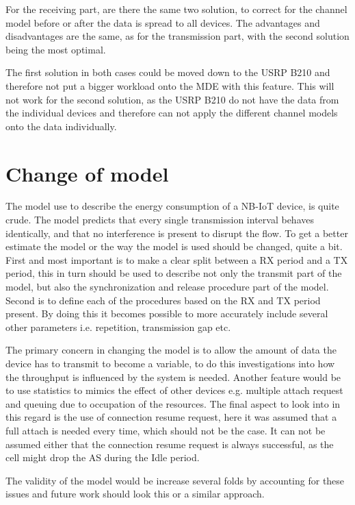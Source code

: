 For the receiving part, are there the same two solution, to correct for the channel model before or after the data is spread to all devices. The advantages and disadvantages are the same, as for the transmission part, with the second solution being the most optimal.

The first solution in both cases could be moved down to the USRP B210 and therefore not put a bigger workload onto the MDE with this feature. This will not work for the second solution, as the USRP B210 do not have the data from the individual devices and therefore can not apply the different channel models onto the data individually.

\section{Change of model}
The model use to describe the energy consumption of a NB-IoT device, is quite crude. The model predicts that every single transmission interval behaves identically, and that no interference is present to disrupt the flow. To get a better estimate the model or the way the model is used should be changed, quite a bit. First and most important is to make a clear split between a RX period and a TX period, this in turn should be used to describe not only the transmit part of the model, but also the synchronization and release procedure part of the model. Second is to define each of the procedures based on the RX and TX period present. By doing this it becomes possible to more accurately include  several other parameters i.e. repetition, transmission gap etc. 

The primary concern in changing the model is to allow the amount of data the device has to transmit to become a variable, to do this investigations into how the throughput is influenced by the system is needed. Another feature would be to use statistics to mimics the effect of other devices e.g. multiple attach request and queuing due to occupation of the resources. The final aspect to look into in this regard is the use of connection resume request, here it was assumed that a full attach is needed every time, which should not be the case. It can not be assumed either that the connection resume request is always successful, as the cell might drop the AS during the Idle period.

The validity of the model would be increase several folds by accounting for these issues and future work should look this or a similar approach.

